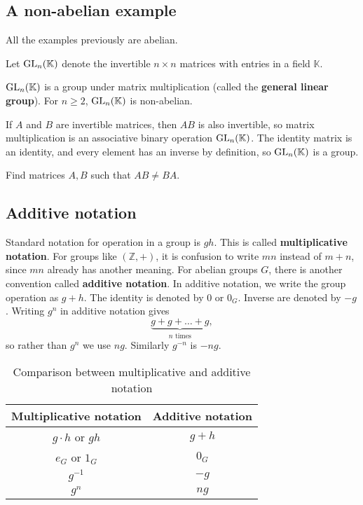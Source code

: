 \subsection*{A non-abelian example}
All the examples previously are abelian.

Let $\operatorname{GL}_n(\mathbb K)$ denote the invertible $n\times n$ matrices with entries in a field $\mathbb K$.

\begin{prop}
$\operatorname{GL}_n(\mathbb K)$ is a group under matrix multiplication (called the \textbf{general linear group}). For $n\ge 2$, $\operatorname{GL}_n(\mathbb K)$ is non-abelian.
\end{prop}

\begin{pf}
If $A$ and $B$ are invertible matrices, then $AB$ is also invertible, so matrix multiplication is an associative binary operation $\operatorname{GL}_n(\mathbb K)$. The identity matrix is an identity, and every element has an inverse by definition, so $\operatorname{GL}_n(\mathbb K)$ is a group.

\begin{exercise}
Find matrices $A,B$ such that $AB\ne BA$.
\end{exercise}
\end{pf}

\subsection{Additive notation}
Standard notation for operation in a group is $gh$. This is called \textbf{multiplicative notation}. For groups like $(\mathbb Z,+)$, it is confusion to write $mn$ instead of $m+n$, since $mn$ already has another meaning. For abelian groups $G$, there is another convention called \textbf{additive notation}. In additive notation, we write the group operation as $g+h$. The identity is denoted by $0$ or $0_G$. Inverse are denoted by $-g$. Writing $g^n$ in additive notation gives 
$$\underbrace{g+g+\ldots+g}_{n\text{ times}},$$
so rather than $g^n$ we use $ng$. Similarly $g^{-n}$ is $-ng$.

\begin{table}
	\centering
\begin{tabular}{c | c}
Multiplicative notation & Additive notation \\\hline 
$g\cdot h$ or $gh$ & $g+h$\\
$e_G$ or $1_G$ & $0_G$\\
$g^{-1}$ & $-g$\\
$g^n$ & $ng$
\end{tabular}
\caption{Comparison between multiplicative and additive notation}
\end{table}

